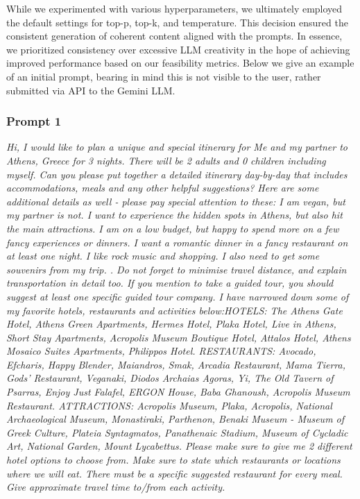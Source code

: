 \documentclass[12pt,a4paper]{report}
\begin{document}
While we experimented with various hyperparameters, we ultimately employed the default settings for top-p, top-k, and temperature.  This decision ensured the consistent generation of coherent content aligned with the prompts.  In essence, we prioritized consistency over excessive LLM creativity in the hope of achieving improved performance based on our feasibility metrics. Below we give an example of an initial prompt, bearing in mind this is not visible to the user, rather submitted via API to the Gemini LLM.

\subsubsection{Prompt 1}
\textit{Hi, I would like to plan a unique and special itinerary for Me and my partner to Athens, Greece for 3 nights. There will be 2 adults and 0 children including myself. Can you please put together a detailed itinerary day-by-day that includes accommodations, meals and any other helpful suggestions? Here are some additional details as well - please pay special attention to these: I am vegan, but my partner is not. I want to experience the hidden spots in Athens, but also hit the main attractions. I am on a low budget, but happy to spend more on a few fancy experiences or dinners. I want a romantic dinner in a fancy restaurant on at least one night. I like rock music and shopping. I also need to get some souvenirs from my trip. . Do not forget to minimise travel distance, and explain transportation in detail too. If you mention to take a guided tour, you should suggest at least one specific guided tour company. I have narrowed down some of my favorite hotels, restaurants and activities below:HOTELS: The Athens Gate Hotel, Athens Green Apartments, Hermes Hotel, Plaka Hotel, Live in Athens, Short Stay Apartments, Acropolis Museum Boutique Hotel, Attalos Hotel, Athens Mosaico Suites Apartments, Philippos Hotel. RESTAURANTS: Avocado, Efcharis, Happy Blender, Maiandros, Smak, Arcadia Restaurant, Mama Tierra, Gods' Restaurant, Veganaki, Diodos Archaias Agoras, Yi, The Old Tavern of Psarras, Enjoy Just Falafel, ERGON House, Baba Ghanoush, Acropolis Museum Restaurant. ATTRACTIONS: Acropolis Museum, Plaka, Acropolis, National Archaeological Museum, Monastiraki, Parthenon, Benaki Museum - Museum of Greek Culture, Plateia Syntagmatos, Panathenaic Stadium, Museum of Cycladic Art, National Garden, Mount Lycabettus. Please make sure to give me 2 different hotel options to choose from. Make sure to state which restaurants or locations where we will eat. There must be a specific suggested restaurant for every meal. Give approximate travel time to/from each activity.}
\end{document}

